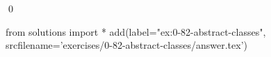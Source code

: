 
\begin{ex}
  \label{ex:0-82-abstract-classes}
  
  \qed
\end{ex}
\begin{python0}
from solutions import *
add(label="ex:0-82-abstract-classes",
    srcfilename='exercises/0-82-abstract-classes/answer.tex')
\end{python0}
